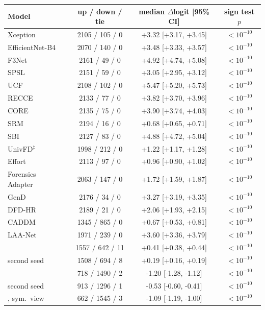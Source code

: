 \begin{tabular}{@{}l ccc@{}}
\toprule
Model & up / down / tie & median $\Delta$logit [95\% CI] & sign test $p$ \\
\midrule
Xception~\cite{xception} & 2105 / 105 / 0 & +3.32 [+3.17, +3.45] & $<10^{-10}$ \\
EfficientNet-B4~\cite{efficientnet} & 2070 / 140 / 0 & +3.48 [+3.33, +3.57] & $<10^{-10}$ \\
F3Net~\cite{f3net} & 2161 / 49 / 0 & +4.92 [+4.74, +5.08] & $<10^{-10}$ \\
SPSL~\cite{spsl} & 2151 / 59 / 0 & +3.05 [+2.95, +3.12] & $<10^{-10}$ \\
UCF~\cite{ucf} & 2108 / 102 / 0 & +5.47 [+5.20, +5.73] & $<10^{-10}$ \\
RECCE~\cite{recce} & 2133 / 77 / 0 & +3.82 [+3.70, +3.96] & $<10^{-10}$ \\
CORE~\cite{core} & 2135 / 75 / 0 & +3.90 [+3.74, +4.03] & $<10^{-10}$ \\
SRM~\cite{srm} & 2194 / 16 / 0 & +0.68 [+0.65, +0.71] & $<10^{-10}$ \\
SBI~\cite{sbi} & 2127 / 83 / 0 & +4.88 [+4.72, +5.04] & $<10^{-10}$ \\
UnivFD$^\ddagger$~\cite{univfd} & 1998 / 212 / 0 & +1.22 [+1.17, +1.28] & $<10^{-10}$ \\
Effort~\cite{effort} & 2113 / 97 / 0 & +0.96 [+0.90, +1.02] & $<10^{-10}$ \\
Forensics Adapter~\cite{forensicsadapter} & 2063 / 147 / 0 & +1.72 [+1.59, +1.87] & $<10^{-10}$ \\
GenD~\cite{gend2026} & 2176 / 34 / 0 & +3.27 [+3.19, +3.35] & $<10^{-10}$ \\
DFD-HR~\cite{dfdhr2026} & 2189 / 21 / 0 & +2.06 [+1.93, +2.15] & $<10^{-10}$ \\
CADDM~\cite{caddm} & 1345 / 865 / 0 & +0.67 [+0.53, +0.81] & $<10^{-10}$ \\
LAA-Net~\cite{laanet} & 1971 / 239 / 0 & +3.60 [+3.36, +3.79] & $<10^{-10}$ \\
\midrule
\oursB{} & 1557 / 642 / 11 & +0.41 [+0.38, +0.44] & $<10^{-10}$ \\
\quad second seed & 1508 / 694 / 8 & +0.19 [+0.16, +0.19] & $<10^{-10}$ \\
\oursF{} & 718 / 1490 / 2 & -1.20 [-1.28, -1.12] & $<10^{-10}$ \\
\quad second seed & 913 / 1296 / 1 & -0.53 [-0.60, -0.41] & $<10^{-10}$ \\
\oursF{}, sym.\ view & 662 / 1545 / 3 & -1.09 [-1.19, -1.00] & $<10^{-10}$ \\

\end{tabular}
